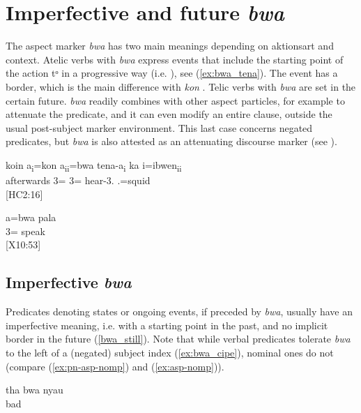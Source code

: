  \section{Imperfective and future \textit{bwa}}	
\label{sec:bwa}
The aspect marker \textit{bwa} has two main meanings depending on aktionsart and context. Atelic verbs with \textit{bwa} express events that include the starting point of the action tᵒ in a progressive way (i.e. ), see (\ref{ex:bwa_tena}). The event has a border, which is the main difference with \textit{kon} . Telic verbs with \textit{bwa} are set in the certain future. \textit{bwa} readily combines with other aspect particles, for example to attenuate the predicate, and it can even modify an entire clause, outside the usual post-subject marker environment. This last case concerns negated predicates, but \textit{bwa} is also attested as an attenuating discourse marker (see ).

\ea \label{ex:bwa_tena}
  \gll koin a\textsubscript{i}=kon {a}\textsubscript{ii}={bwa} tena-a\textsubscript{i} ka i={ibwen}\textsubscript{ii}\\
   afterwards 3= 3= hear-3.  .=squid \\
  \glt {} {[HC2:16]}
  \z
                             
     \ea\label{ex:bwa_pala}
     \gll a=bwa pala\\
      3= speak\\
     \glt {} {[X10:53]}
\z 

\subsection{Imperfective \textit{bwa}}
\label{ssec:bwa_imp}
Predicates denoting states or ongoing events, if preceded by \textit{bwa}, usually have an  imperfective meaning, i.e. with a starting point in the past, and no implicit border in the future (\ref{bwa_still}). Note that while verbal predicates tolerate \textit{bwa} to the left of a (negated) subject index (\ref{ex:bwa_cipe}), nominal ones do not (compare (\ref{ex:pn-asp-nomp}) and (\ref{ex:asp-nomp})).


\ea\label{bwa_still}
\gll tha bwa nyau\\
   bad\\
\glt {}
\z


